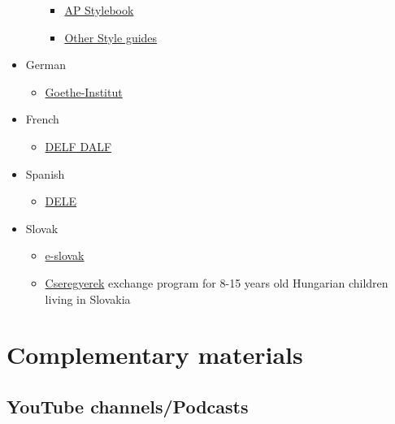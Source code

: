 \documentclass{article}
\begin{document}
\begin{itemize}
\begin{itemize}
\begin{itemize}
            \item \href{https://www.apstylebook.com/}{AP Stylebook}
            \item \href{https://en.wikipedia.org/wiki/Style_guide}{Other Style guides}
        \end{itemize}
    \end{itemize}
    \item German
    \begin{itemize}
        \item \href{https://www.goethe.de/en/index.html}{Goethe-Institut}
    \end{itemize}
    \item French
    \begin{itemize}
        \item \href{http://www.delfdalf.fr/index-en.html}{DELF DALF}
    \end{itemize}
    \item Spanish
    \begin{itemize}
        \item \href{https://www.dele.org/}{DELE}
    \end{itemize}
    \item Slovak
    \begin{itemize}
        \item \href{https://www.e-slovak.sk/}{e-slovak}
        \item \href{https://www.cseregyerek.sk/}{Cseregyerek} exchange program for 8-15 years old Hungarian children living in Slovakia 
    \end{itemize}
\end{itemize}

\section{Complementary materials}

\subsection{YouTube channels/Podcasts}
\end{document}
